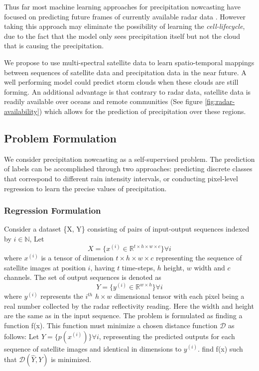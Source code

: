 Thus far most machine learning approaches for precipitation nowcasting have focused on predicting future frames of currently available radar data \cite{shi2017deep, convlstm, rainet}. However taking this approach may eliminate the possibility of learning the \textit{cell-lifecycle}, due to the fact that the model only sees precipitation itself but not the cloud that is causing the precipitation.
\medskip


We propose to use multi-spectral satellite data to learn spatio-temporal mappings between sequences of satellite data and precipitation data in the near future. A well performing model could predict storm clouds when these clouds are still forming. An additional advantage is that contrary to radar data, satellite data is readily available over oceans and remote communities (See figure \ref{fig:radar-availability}) which allows for the prediction of precipitation over these regions.
\medskip

\subsection{Problem Formulation}
We consider precipitation nowcasting as a self-supervised problem.
The prediction of labels can be accomplished through two approaches: predicting discrete classes that correspond to different rain intensity intervals, or conducting pixel-level regression to learn the precise values of precipitation.

\subsubsection{Regression Formulation} Consider a dataset \{X, Y\} consisting of pairs of input-output sequences indexed by $i \in \mathbb{N}$,
Let $$X = \{x^{(i)} \in \mathbb{R}^{t \times h \times w \times c}\} \forall i$$ 
where $x^{(i)}$ is a tensor of dimension $t \times h \times w \times c$ representing the sequence of satellite images at position $i$, having $t$ time-steps, $h$ height, $w$ width and $c$ channels.
The set of output sequences is denoted as $$Y = \{y^{(i)} \in \mathbb{R}^{w\times h}\}\forall i$$
where $y^{(i)}$ represents the $i^{th}$ $h \times w$ dimensional tensor with each pixel being a real number collected by the radar reflectivity reading.
Here the width and height are the same as in the input sequence.
The problem is formulated as finding a function f(x). This function must minimize a chosen distance function $\mathcal{D}$ as follows:
Let $\hat{Y} = \{p(x^{(i)})\}\forall i$, representing the predicted outputs for each sequence of satellite images and identical in dimensions to $y^{(i)}$.
find f(x) such that $\mathcal{D}(\hat{Y}, Y)$ is minimized.

